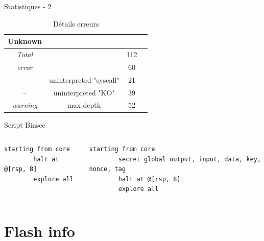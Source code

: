 \documentclass[A4,svgnames,9pt,aspectratio=169]{beamer}
\begin{document}

\begin{frame}{Statistiques - 2}
  \begin{table}[h]
    \centering
    \begin{tabular}{|c|c|c|c|}
      \hline
      \textbf{Unknown} &  & \\
      \hline
      \textit{Total} &  & 112 \\
      \hline
      \hline
      \textit{error} &  & 60 \\
      \hline
      -- & uninterpreted "syscall" & 21 \\
      \hline
      -- & uninterpreted "KO" & 39 \\
      \hline
      \textit{warning} & max depth & 52 \\
      \hline
    \end{tabular}
    \caption{Détails erreurs}
    \label{tab:unknown}
  \end{table}
\end{frame}



\begin{frame}[fragile]{Script Binsec}
  \begin{columns}
    \begin{column}{0.5\textwidth}
      \begin{lstlisting}[style=INIStyle, caption={HFStar\_UInt64\_eq\_mask.ini}, gobble=8]
        starting from core
        halt at @[rsp, 8]
        explore all
      \end{lstlisting}
    \end{column}

    \begin{column}{0.5\textwidth}
      \begin{lstlisting}[style=INIStyle, caption={Hacl\_AEAD\_Chacha20Poly1305\_decrypt.ini}, gobble=8]
        starting from core
        secret global output, input, data, key, nonce, tag
        halt at @[rsp, 8]
        explore all
      \end{lstlisting}
    \end{column}
  \end{columns}
\end{frame}


\section*{Flash info}
\frame{\sectionpage}
\end{document}
